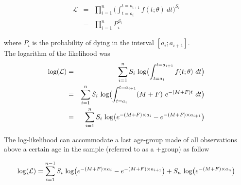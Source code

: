 \begin{eqnarray}
\mathcal{L}  &=& \prod_{i=1}^{n} \bigl ( \int_{t=a_{i}}^{t=a_{i+1}} f(t; \theta) \ dt \bigr ) ^ {S_{i}} \\
            &=& \prod_{i=1}^{n} P_{i} ^ {S_{i}}
\end{eqnarray}



\noindent where $P_{i}$ is the probability of dying in the interval $[a_{i}; a_{i+1}]$.\\

The logarithm of the likelihood was
\begin{eqnarray}
{\rm log}(\mathcal{L}) &=& \sum_{i=1}^{n} S_{i} \ {\rm log} \bigl ( \int_{t=a_{i}}^{t=a_{i+1}} f(t; \theta) \ dt \bigr ) \\
                       &=& \sum_{i=1}^{n} S_{i} \ {\rm log} \bigl ( \int_{t=a_{i}}^{t=a_{i+1}} (M + F) \ e^{-(M+F)t} \ dt \bigr ) \\
                       &=& \sum_{i=1}^{n} S_{i} \ {\rm log} \bigl ( e^{-(M+F) \times a_{i}} - e^{-(M+F) \times a_{i+1}} \bigr )
\label{eq:16}
\end{eqnarray}

The log-likelihood can accommodate a last age-group made of all observations above a certain age in the sample (referred to as a +group) as follow \citep{pawitan2013all}

\begin{equation}
{\rm log}(\mathcal{L}) = \sum_{i=1}^{n-1} S_{i} \ {\rm log} \bigl ( e^{-(M+F) \times a_{i}} - e^{-(M+F) \times a_{i+1}} \bigr ) + S_{n} \ {\rm log} \bigl ( e^{-(M+F) \times a_{n}} \bigr )
\end{equation}


